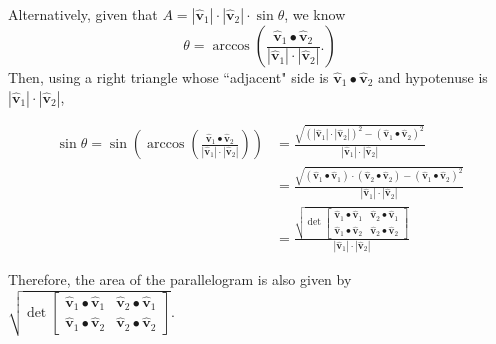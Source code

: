 \documentclass[newpage,hints,handout,nooutcomes,noauthor,12pt]{ximera}
\begin{document}
\begin{problem}
\begin{freeResponse}
Alternatively, given that $A = |\hat{\mathbf v}_{1}| \cdot |\hat{\mathbf v}_{2}| \cdot\sin\theta$, we know
\[
\theta = \arccos \left( 
	\frac{\hat{\mathbf v}_{1}\bullet\hat{\mathbf v}_{2}}{\left\vert \hat{\mathbf v}_{1}\right\vert \cdot\left\vert \hat{\mathbf v}_{2}\right\vert}.
		 \right)
\]
Then, using a right triangle whose ``adjacent" side is $\hat{\mathbf v}_{1}\bullet\hat{\mathbf v}_{2}$ and hypotenuse is $\left\vert \hat{\mathbf v}_{1}\right\vert \cdot\left\vert \hat{\mathbf v}_{2}\right\vert$,

\begin{align*}
\sin \theta = \sin\left(  \arccos\left(  \frac{\hat{\mathbf v}_{1}\bullet\hat{\mathbf v}_{2}}{\left\vert \hat{\mathbf v}_{1}\right\vert \cdot\left\vert 	\hat{\mathbf v}_{2}\right\vert} \right)  \right) 
	&= \frac{\sqrt{
	 \left( \left\vert \hat{\mathbf v}_{1}\right\vert \cdot\left\vert \hat{\mathbf v}_{2}\right\vert \right)^2 
	- \left( \hat{\mathbf v}_{1}\bullet\hat{\mathbf v}_{2} \right)^2}}{\left\vert \hat{\mathbf v}_{1}\right\vert \cdot\left\vert \hat{\mathbf v}_{2}\right\vert}  \\
	&= \frac{\sqrt{ 
	\left( \hat{\mathbf v}_{1}\bullet\hat{\mathbf v}_{1} \right) \cdot \left(\hat{\mathbf v}_{2}\bullet\hat{\mathbf v}_{2} \right)
	- \left( \hat{\mathbf v}_{1}\bullet\hat{\mathbf v}_{2} \right)^2}}{\left\vert\hat{\mathbf v}_{1}\right\vert \cdot\left\vert \hat{\mathbf v}_{2}\right\vert}\\
	&=\frac{\sqrt{\det
    	\begin{bmatrix}
      		\hat{\mathbf v}_{1}\bullet\hat{\mathbf v}_{1} & \hat{\mathbf v}_{2}\bullet\hat{\mathbf v}_{1}\\
      		\hat{\mathbf v}_{1}\bullet\hat{\mathbf v}_{2} & \hat{\mathbf v}_{2}\bullet\hat{\mathbf v}_{2}
    	\end{bmatrix}}}{\left\vert\hat{\mathbf v}_{1}\right\vert \cdot\left\vert \hat{\mathbf v}_{2}\right\vert}
\end{align*}

Therefore, the area of the parallelogram is also given by
$\sqrt{\det
    \begin{bmatrix}
      \hat{\mathbf v}_{1}\bullet\hat{\mathbf v}_{1} & \hat{\mathbf v}_{2}\bullet\hat{\mathbf v}_{1}\\
      \hat{\mathbf v}_{1}\bullet\hat{\mathbf v}_{2} & \hat{\mathbf v}_{2}\bullet\hat{\mathbf v}_{2}
    \end{bmatrix}}$.

\end{freeResponse}

\end{problem}
\end{document}
